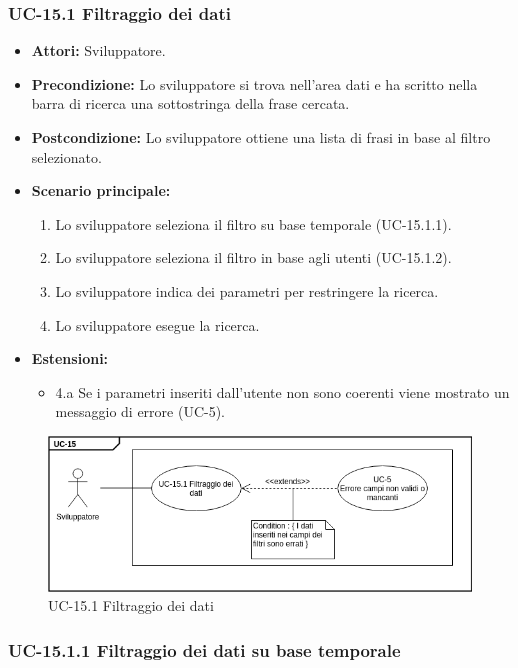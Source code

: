 	\subsubsection{UC-15.1 Filtraggio dei dati}	
		\begin{itemize}
			\item \textbf{Attori:} Sviluppatore.
			\item \textbf{Precondizione:} Lo sviluppatore si trova nell'area dati e ha scritto nella barra di ricerca una sottostringa della frase cercata.
			\item \textbf{Postcondizione:} Lo sviluppatore ottiene una lista di frasi in base al filtro selezionato.
			\item \textbf{Scenario principale:}
				\begin{enumerate}
					\item Lo sviluppatore seleziona il filtro su base temporale (UC-15.1.1).
					\item Lo sviluppatore seleziona il filtro in base agli utenti (UC-15.1.2).
					\item Lo sviluppatore indica dei parametri per restringere la ricerca.
					\item Lo sviluppatore esegue la ricerca.
				\end{enumerate}	
			\item \textbf{Estensioni:}
				\begin{itemize}
					\item 4.a Se i parametri inseriti dall'utente non sono coerenti viene mostrato un messaggio di errore (UC-5).
				\end{itemize}		
		\end{itemize}
	\begin{figure}[h]
			\centering
			\includegraphics[scale=0.7]{images/UC-15_1.png}
			\caption{UC-15.1 Filtraggio dei dati}
		\end{figure}	
	
	\subsubsection{UC-15.1.1 Filtraggio dei dati su base temporale}	
		

